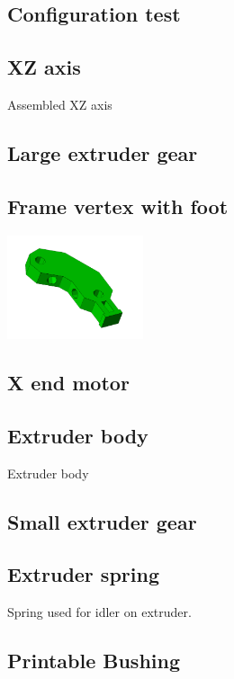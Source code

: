 \documentclass[11pt]{article}
\begin{document}
\hypertarget{thing_calibration}{\subsection{Configuration test}}

\hypertarget{thing_xz-axis}{\subsection{XZ axis}}
Assembled XZ axis

\hypertarget{thing_large-gear}{\subsection{Large extruder gear}}

\hypertarget{thing_frame-vertex-foot}{\subsection{Frame vertex with foot}}
\includegraphics[width=4cm]{images/frame-vertex-foot.jpg}

\hypertarget{thing_x-end-motor}{\subsection{X end motor}}

\hypertarget{thing_extruder-body}{\subsection{Extruder body}}
Extruder body

\hypertarget{thing_small-gear}{\subsection{Small extruder gear}}

\hypertarget{thing_extruder-spring}{\subsection{Extruder spring}}
Spring used for idler on extruder.

\hypertarget{thing_printable-bushing}{\subsection{Printable Bushing}}
\end{document}
